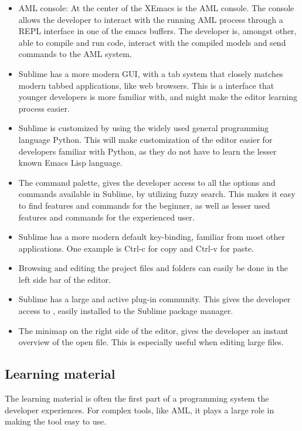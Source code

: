 \begin{itemize}
    \item AML console: At the center of the XEmacs is the AML console. The console allows the developer to interact with the running AML process through a REPL interface in one of the emacs buffers. The developer is, amongst other, able to compile and run code, interact with the compiled models and send commands to the AML system.

    \item Sublime has a more modern GUI, with a tab system that closely matches modern tabbed applications, like web browsers. This is a interface that younger developers is more familiar with, and might make the editor learning process easier.

    \item Sublime is customized by using the widely used general programming language Python. This will make customization of the editor easier for developers familiar with Python, as they do not have to learn the lesser known Emacs Lisp language.

    \item The command palette, gives the developer access to all the options and commands available in Sublime, by utilizing fuzzy search. This makes it easy to find features and commands for the beginner, as well as lesser used features and commands for the experienced user.

    \item Sublime has a more modern default key-binding, familiar from most other applications. One example is Ctrl-c for copy and Ctrl-v for paste.

    \item Browsing and editing the project files and folders can easily be done in the left side bar of the editor.

    \item Sublime has a large and active plug-in community. This gives the developer access to , easily installed to the Sublime package manager.

    \item The minimap on the right side of the editor, gives the developer an instant overview of the open file. This is especially useful when editing large files.
\end{itemize}

\subsection{Learning material} %
\label{sub:learning_material}
The learning material is often the first part of a programming system the developer experiences. For complex tools, like AML, it plays a large role in making the tool easy to use.

